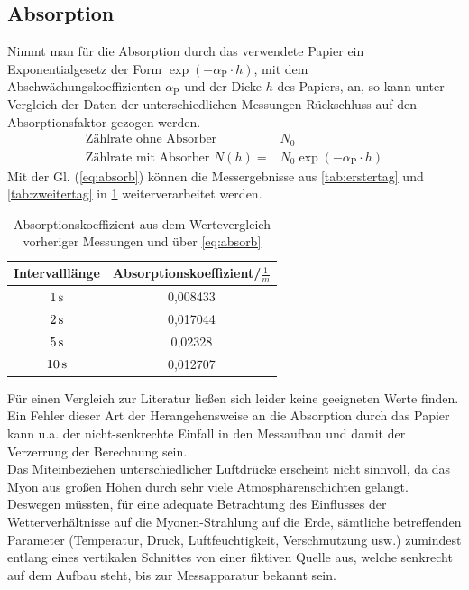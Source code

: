 \documentclass[numbers=noenddot,12pt,a4paper]{scrartcl}
\newcommand{\ix}[1]{_\text{#1}}
\begin{document}
\subsection{Absorption}
Nimmt man für die Absorption durch das verwendete Papier ein Exponentialgesetz der Form $\exp\left(-\alpha\ix{P}\cdot h\right)$, mit dem Abschwächungskoeffizienten $\alpha\ix{P}$ und der Dicke $h$ des Papiers, an, so kann unter Vergleich der Daten der unterschiedlichen Messungen Rückschluss auf den Absorptionsfaktor gezogen werden.\\
\begin{align}
	\text{Zählrate ohne Absorber }&N\ix{0} \nonumber \\
	\text{Zählrate mit Absorber }N\left(h\right)=&N\ix{0}\exp\left(-\alpha\ix{P}\cdot h\right) \label{eq:absorb}
\end{align}
Mit der Gl. (\ref{eq:absorb}) können die Messergebnisse aus \ref{tab:erstertag} und \ref{tab:zweitertag} in \ref{tab:endlich} weiterverarbeitet werden.
\begin{table}[H]
	\centering
	\begin{tabular}{c|c}
		Intervalllänge & Absorptionskoeffizient/$\unit{\frac{1}{m}}$ \\ \hline
		$\unit[1]{s}$ & 0,008433 \\ \hline
		$\unit[2]{s}$ & 0,017044 \\ \hline
		$\unit[5]{s}$ & 0,02328\\ \hline
		$\unit[10]{s}$ & 0,012707
	\end{tabular}
\caption{Absorptionskoeffizient aus dem Wertevergleich vorheriger Messungen und über \ref{eq:absorb}}\label{tab:endlich}
\end{table}
Für einen Vergleich zur Literatur ließen sich leider keine geeigneten Werte finden.\\
Ein Fehler dieser Art der Herangehensweise an die Absorption durch das Papier kann u.a. der nicht-senkrechte Einfall in den Messaufbau und damit der Verzerrung der Berechnung sein.\\
Das Miteinbeziehen unterschiedlicher Luftdrücke erscheint nicht sinnvoll, da das Myon aus großen Höhen durch sehr viele Atmosphärenschichten gelangt. Deswegen müssten, für eine adequate Betrachtung des Einflusses der Wetterverhältnisse auf die Myonen-Strahlung auf die Erde, sämtliche betreffenden Parameter (Temperatur, Druck, Luftfeuchtigkeit, Verschmutzung usw.) zumindest entlang eines vertikalen Schnittes von einer fiktiven Quelle aus, welche senkrecht auf dem Aufbau steht, bis zur Messapparatur bekannt sein.
\end{document}
